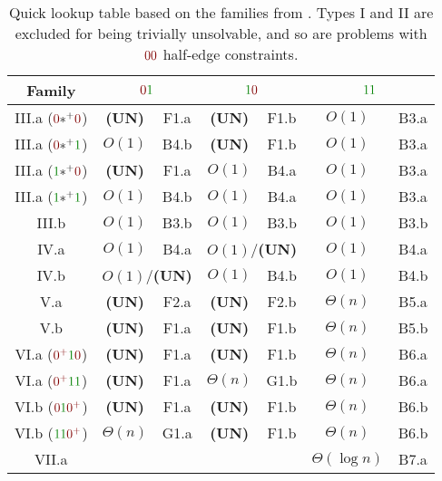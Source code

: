\renewcommand{\arraystretch}{1.25}
\begin{table}[th]
    \centering
    \begin{tabular}{|c|cc|cc|cc|}
        \hline
        Family & \multicolumn{2}{c|}{$\n\y$} & \multicolumn{2}{c|}{$\y\n$} & \multicolumn{2}{c|}{$\y\y$} \\
        \hline
        \textsf{III.a} ($\n\xpl\n$) & \textbf{(UN)} & F1.a & \textbf{(UN)} & F1.b & \boldmath$O(1)$ & B3.a\\
        \textsf{III.a} ($\n\xpl\y$) & \boldmath$O(1)$ & B4.b & \textbf{(UN)} & F1.b & \boldmath$O(1)$ & B3.a\\
        \textsf{III.a} ($\y\xpl\n$) & \textbf{(UN)} & F1.a & \boldmath$O(1)$ & B4.a & \boldmath$O(1)$ & B3.a\\
        \textsf{III.a} ($\y\xpl\y$) & \boldmath$O(1)$ & B4.b & \boldmath$O(1)$ & B4.a & \boldmath$O(1)$ & B3.a\\
        \textsf{III.b} & \boldmath$O(1)$ & B3.b & \boldmath$O(1)$ & B3.b & \boldmath$O(1)$ & B3.b\\
        \textsf{IV.a}  & \boldmath$O(1)$ & B4.a &\multicolumn{2}{c|}{\boldmath$O(1)$/\textbf{(UN)}}& \boldmath$O(1)$ & B4.a\\
        \textsf{IV.b}  &\multicolumn{2}{c|}{\boldmath$O(1)$/\textbf{(UN)}}& \boldmath$O(1)$ & B4.b & \boldmath$O(1)$ & B4.b\\
        \textsf{V.a}   & \textbf{(UN)} & F2.a & \textbf{(UN)} & F2.b & \boldmath$\Theta(n)$ & B5.a\\
        \textsf{V.b}   & \textbf{(UN)} & F1.a & \textbf{(UN)} & F1.b & \boldmath$\Theta(n)$ & B5.b\\
        \textsf{VI.a} ($\colr{0^+}\y\n$)  & \textbf{(UN)} & F1.a & \textbf{(UN)} & F1.b & \boldmath$\Theta(n)$ & B6.a\\
        \textsf{VI.a} ($\colr{0^+}\y\y$)  & \textbf{(UN)} & F1.a & \boldmath$\Theta(n)$ & G1.b & \boldmath$\Theta(n)$ & B6.a\\
        \textsf{VI.b} ($\n\y\colr{0^+}$) & \textbf{(UN)} & F1.a & \textbf{(UN)} & F1.b & \boldmath$\Theta(n)$ & B6.b\\
        \textsf{VI.b} ($\y\y\colr{0^+}$) & \boldmath$\Theta(n)$ & G1.a & \textbf{(UN)} & F1.b & \boldmath$\Theta(n)$ & B6.b\\
        \textsf{VII.a}   & & & & &\boldmath$\Theta(\log n)$& B7.a \\
        \hline
    \end{tabular}
    \caption{Quick lookup table based on the families from \cite{balliu-2019}. Types \textsf{I} and \textsf{II} are excluded for being trivially unsolvable, and so are problems with $\n\n$ half-edge constraints.}
    \label{tab:short-lookup}
\end{table}
\renewcommand{\arraystretch}{1}